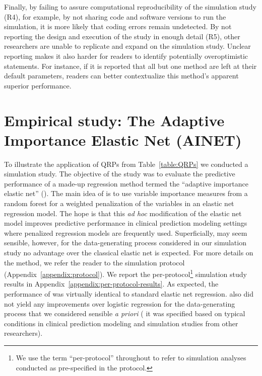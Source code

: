 \documentclass[a4paper, 11pt]{article}
\begin{document}
Finally, by failing to assure computational reproducibility of the simulation study (R4),
for example, by not sharing code and software versions to run the simulation,
it is more likely that coding errors remain undetected. By not reporting the design and
execution of the study in enough detail (R5), other researchers are unable to replicate
and expand on the simulation study.
Unclear reporting makes it also harder for readers to identify potentially overoptimistic
statements. For instance, if it is reported that all but one method are left at their
default parameters, readers can better contextualize this method's apparent superior
performance.


\section{Empirical study: The Adaptive Importance Elastic Net
  (AINET)} \label{sec:study}

To illustrate the application of QRPs from Table~\ref{table:QRPs} we conducted
a simulation study. The objective of the study was to evaluate the predictive
performance of a made-up regression method termed the ``adaptive importance
elastic net'' (\ainet). The main idea of \ainet{} is to use variable
importance measures from a random forest for a weighted penalization of the
variables in an elastic net regression model. The hope is that this \emph{ad hoc}
modification of the elastic net model improves predictive performance in clinical prediction modeling
settings where penalized regression models are frequently used. Superficially,
\ainet{} may seem sensible, however, for the data-generating process 
considered in our simulation study no
advantage over the classical elastic net is expected. For more details
on the method, we refer the reader to the simulation protocol (Appendix~\ref{appendix:protocol}). 
We report the per-protocol\footnote{We use the term ``per-protocol'' throughout to 
refer to simulation analyses conducted as pre-specified in the protocol.} simulation study 
results in Appendix~\ref{appendix:per-protocol-results}. As expected, 
the performance of \ainet{} was virtually identical to standard elastic net
regression.  \ainet{} also did not yield any improvements over logistic
regression for the data-generating process that we considered sensible 
\emph{a priori} (\ie{} it was specified based on typical conditions
in clinical prediction modeling and simulation studies
from other researchers).
\end{document}
